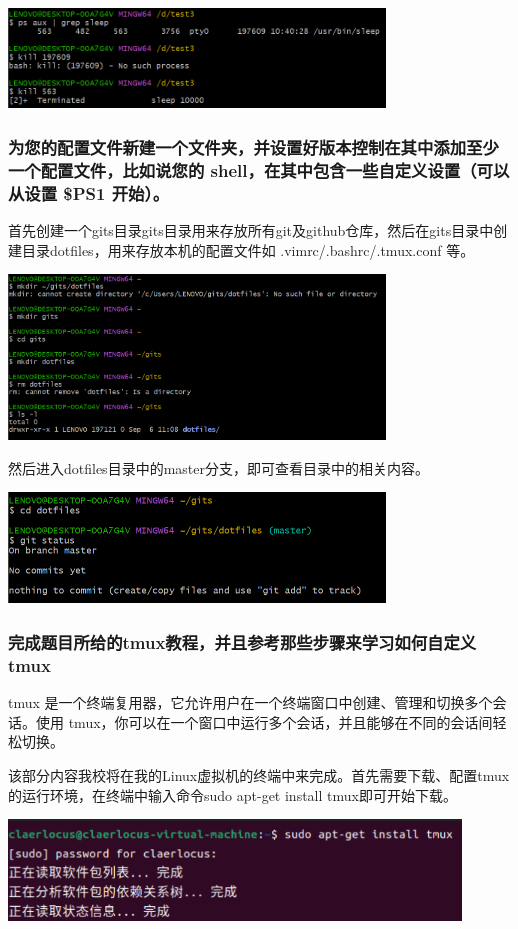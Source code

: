 \documentclass[UTF8,a4paper]{ctexart}
\begin{document}
\begin{sloppypar}
	\includegraphics[width = 10cm]{2}
	
	\subsubsection{为您的配置文件新建一个文件夹，并设置好版本控制在其中添加至少一个配置文件，比如说您的 shell，在其中包含一些自定义设置（可以从设置 \$PS1 开始）。}
	首先创建一个gits目录gits目录用来存放所有git及github仓库，然后在gits目录中创建目录dotfiles，用来存放本机的配置文件如 .vimrc/.bashrc/.tmux.conf 等。

	\includegraphics[width = 10cm]{3}

	然后进入dotfiles目录中的master分支，即可查看目录中的相关内容。

	\includegraphics[width = 10cm]{4}
	
	\subsubsection{完成题目所给的tmux教程，并且参考那些步骤来学习如何自定义tmux}
	tmux 是一个终端复用器，它允许用户在一个终端窗口中创建、管理和切换多个会话。使用 tmux，你可以在一个窗口中运行多个会话，并且能够在不同的会话间轻松切换。
	
	该部分内容我校将在我的Linux虚拟机的终端中来完成。首先需要下载、配置tmux的运行环境，在终端中输入命令sudo apt-get install tmux即可开始下载。

	\includegraphics[width = 12cm]{5}


\end{sloppypar}
\end{document}
